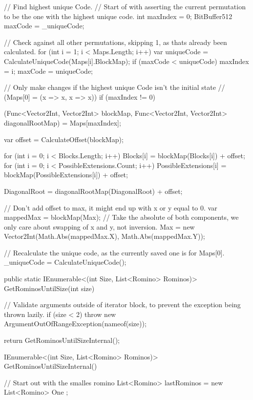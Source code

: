 \documentclass[a4paper,10pt,ngerman]{scrartcl}
\begin{document}
\begin{lstcs}
{{        // Find highest unique Code.
        // Start of with asserting the current permutation to be the one with the highest unique code.
        int maxIndex = 0;
        BitBuffer512 maxCode = _uniqueCode;

        // Check against all other permutations, skipping 1, as thats already been calculated.
        for (int i = 1; i < Maps.Length; i++)
        {
            var uniqueCode = CalculateUniqueCode(Maps[i].BlockMap);
            if (maxCode < uniqueCode)
            {
                maxIndex = i;
                maxCode = uniqueCode;
            }
        }

        // Only make changes if the highest unique Code isn't the initial state
        // (Maps[0] = (x => x, x => x))
        if (maxIndex != 0)
        {
            (Func<Vector2Int, Vector2Int> blockMap, Func<Vector2Int, Vector2Int> diagonalRootMap) = Maps[maxIndex];

            var offset = CalculateOffset(blockMap);

            for (int i = 0; i < Blocks.Length; i++) Blocks[i] = blockMap(Blocks[i]) + offset;
            for (int i = 0; i < PossibleExtensions.Count; i++) PossibleExtensions[i] = blockMap(PossibleExtensions[i]) + offset;

            DiagonalRoot = diagonalRootMap(DiagonalRoot) + offset;

            // Don't add offset to max, it might end up with x or y equal to 0.
            var mappedMax = blockMap(Max);
            // Take the absolute of both components, we only care about swapping of x and y, not inversion.
            Max = new Vector2Int(Math.Abs(mappedMax.X), Math.Abs(mappedMax.Y));

            // Recalculate the unique code, as the currently saved one is for Maps[0].
            _uniqueCode = CalculateUniqueCode();
        }
    }

    public static IEnumerable<(int Size, List<Romino> Rominos)> GetRominosUntilSize(int size)
    {
        // Validate arguments outside of iterator block, to prevent the exception being thrown lazily.
        if (size < 2) throw new ArgumentOutOfRangeException(nameof(size));

        return GetRominosUntilSizeInternal();

        IEnumerable<(int Size, List<Romino> Rominos)> GetRominosUntilSizeInternal()
        {
            // Start out with the smalles romino
            List<Romino> lastRominos = new List<Romino> { One };

}}}
\end{lstcs}
\end{document}
